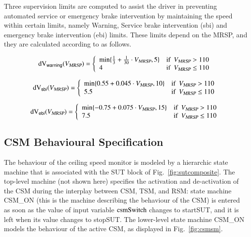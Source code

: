 Three supervision limits are computed to assist the driver in
preventing automated service or emergency brake intervention by
maintaining the speed within certain limits, namely Warning, Service
brake intervention (sbi) and emergency brake intervention (ebi)
limits. These limits depend on the MRSP, and they are calculated
according to \cite{ETCSSRS-Principles} as follows.



 
\begin{equation}\label{eq:dvw}
\dvw(\vmax) = \left\{
\begin{array}{lc}
\min\{\frac{1}{3} + \frac{1}{30}\cdot\vmax,5 \}  &    \text{if}\ \ \vmax > 110 \\
4  &  \text{if}\ \ \vmax\le  110 \\
\end{array}
\right.
\end{equation}

\begin{equation}\label{eq:dvsbi}
\text{dV}_{\mathsf{sbi}}({V_{\text{\sl MRSP}}}) = \left\{
\begin{array}{lc}
\min\{0.55+0.045\cdot{V_{\text{\sl MRSP}}},10 \}  &    \text{if}\ \ {V_{\text{\sl MRSP}}} > 110 \\
5.5  &  \text{if}\ \ {V_{\text{\sl MRSP}}}\le  110 \\
\end{array}
\right.
\end{equation}

\begin{equation}\label{eq:dvwe}
\text{dV}_{\mathsf{ebi}}({V_{\text{\sl MRSP}}}) = \left\{
\begin{array}{lc}
\min\{-0.75 + 0.075\cdot{V_{\text{\sl MRSP}}},15 \}  &    \text{if}\ \ {V_{\text{\sl MRSP}}} > 110 \\
7.5  &  \text{if}\ \ {V_{\text{\sl MRSP}}}\le  110 \\
\end{array}
\right.
\end{equation}

 


   
\subsection{CSM Behavioural Specification}
The behaviour of the ceiling speed monitor is modeled by a hierarchic state machine 
that is associated with the SUT block of Fig.~\ref{fig:sutcomposite}. The top-level machine (not shown here)
specifies the activation and de-activation of the CSM during the interplay between CSM, TSM, and RSM: state machine {\sf CSM\_ON} (this is the machine 
describing the behaviour of the CSM) is entered as soon as the value of 
input variable $\text{csmSwitch}$ changes to {\sf startSUT}, and it is left when its value
changes to {\sf stopSUT}. 
The lower-level state machine  {\sf CSM\_ON}
models the behaviour of the active CSM, as displayed in Fig.~\ref{fig:csmsm}.

